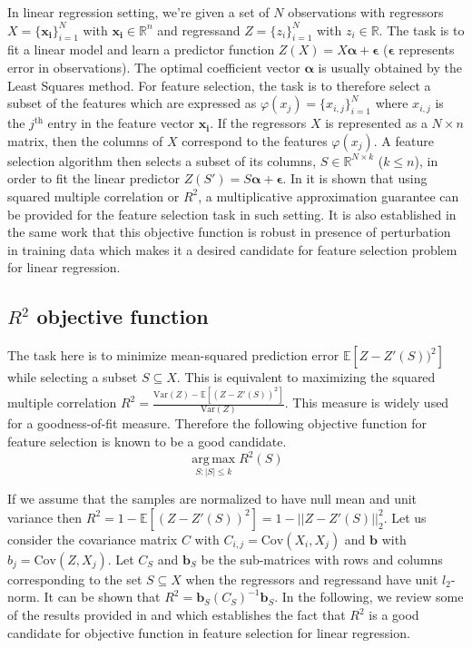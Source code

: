 In linear regression setting, we're given a set of $N$ observations with regressors $X=\{\mathbf{x_i}\}_{i=1}^N$ with $\mathbf{x_i}\in \mathbb{R}^n$ and regressand $Z=\{z_i\}_{i=1}^N$ with $z_i\in \mathbb{R}$. The task is to fit a linear model and learn a predictor function $Z(X)=X\boldsymbol\alpha+\boldsymbol\epsilon$ ($\boldsymbol\epsilon$ represents error in observations). The optimal coefficient vector $\boldsymbol\alpha$ is usually obtained by the Least Squares method. For feature selection, the task is to therefore select a subset of the features which are expressed as $\varphi(x_j)=\{x_{i,j}\}_{i=1}^N$ where $x_{i,j}$ is the $j^{\text{th}}$ entry in the feature vector $\mathbf{x_i}$. If the regressors $X$ is represented as a $N\times n$ matrix, then the columns of $X$ correspond to the features $\varphi(x_j)$. A feature selection algorithm then selects a subset of its columns, $S\in\mathbb{R}^{N\times k}$ ($k\le n$), in order to fit the linear predictor $Z(S')=S\boldsymbol\alpha + \boldsymbol\epsilon$. In \citealp{Das:2008:ASS:1374376.1374384} it is shown that using squared multiple correlation or $R^2$, a multiplicative approximation guarantee can be provided for the feature selection task in such setting. It is also established in the same work that this objective function is robust in presence of perturbation in training data which makes it a desired candidate for feature selection problem for linear regression.

\subsection{$R^2$ objective function}
\label{subsection:rsq}
The task here is to minimize mean-squared prediction error $\mathbb{E}[Z-Z'(S))^2]$ while selecting a subset $S\subseteq X$. This is equivalent to maximizing the squared multiple correlation $R^2=\frac{\text{Var}(Z)-\mathbb{E}[(Z-Z'(S))^2]}{\text{Var}(Z)}$. This measure is widely used for a goodness-of-fit measure. Therefore the following objective function for feature selection is known to be a good candidate.
\[
 \operatorname*{arg\,max}_{S:|S|\le k} R^2(S)
\]

\noindent If we assume that the samples are normalized to have null mean and unit variance then $R^2=1-\mathbb{E}[(Z-Z'(S))^2]=1-||Z-Z'(S)||_2^2$. Let us consider the covariance matrix $C$ with $C_{i,j}=\text{Cov}(X_i,X_j)$ and $\mathbf{b}$ with $b_j=\text{Cov}(Z,X_j)$. Let $C_S$ and $\mathbf{b}_S$ be the sub-matrices with rows and columns corresponding to the set $S\subseteq X$ when the regressors and regressand have unit $l_2$-norm. It can be shown that $R^2=\mathbf{b}_S(C_S)^{-1}\mathbf{b}_S$. In the following, we review some of the results provided in \citealp{Das:2008:ASS:1374376.1374384} and \citealp{DasDK11} which establishes the fact that $R^2$ is a good candidate for objective function in feature selection for linear regression.

